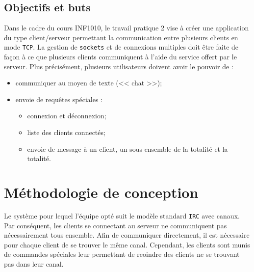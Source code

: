 \documentclass[12pt,french]{article}
\begin{document}
        \subsection{Objectifs et buts} %
        \label{sub:obj-buts}
            Dans le cadre du cours INF1010, le travail pratique 2 vise à créer une application du type
            client/serveur permettant la communication entre plusieurs clients en mode {\tt TCP}. La
            gestion de {\tt sockets} et de connexions multiples doit être faite de façon à ce que
            plusieurs clients communiquent à l'aide du service offert par le serveur. Plus précisément,
            plusieurs utilisateurs doivent avoir le pouvoir de :
            \begin{itemize}
                \item communiquer au moyen de texte (<< chat >>);
                \item envoie de requêtes spéciales :
                    \begin{itemize}
                        \item connexion et déconnexion;
                        \item liste des clients connectés;
                        \item envoie de message à un client, un sous-ensemble de la totalité et la
                            totalité.
                    \end{itemize}
            \end{itemize}

    \section{Méthodologie de conception} %
    \label{sec:method-concept}
        Le système pour lequel l'équipe opté suit le modèle standard {\tt IRC} avec canaux. Par
        conséquent, les clients se connectant au serveur ne communiquent pas nécessairement tous
        ensemble. Afin de communiquer directement, il est nécessaire pour chaque client de se
        trouver le même canal. Cependant, les clients sont munis de commandes spéciales leur
        permettant de reoindre des clients ne se trouvant pas dans leur canal.


\end{document}
